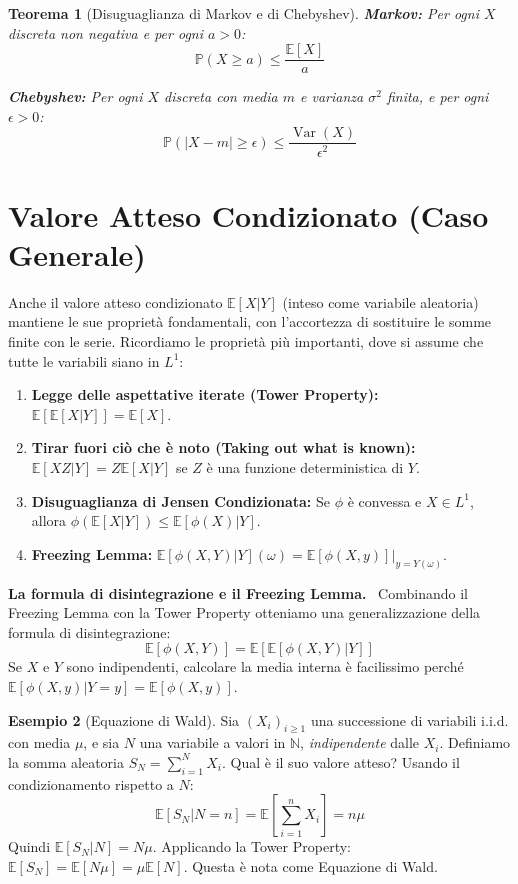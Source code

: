 \documentclass[11pt, a4paper]{report}
\theoremstyle{plain}
\newtheorem{theorem}{Teorema}[chapter]
\theoremstyle{definition}
\newtheorem{esempio}[theorem]{Esempio}
\theoremstyle{remark}
\newenvironment{hint}[1][Hint]
{\begin{mdframed}[backgroundcolor=blue!5, linecolor=blue!50, linewidth=2pt, topline=false, rightline=false, bottomline=false]
\textbf{\textsf{#1.}}\ }
{\end{mdframed}}
\newcommand{\PP}{\mathbb{P}}
\newcommand{\E}{\mathbb{E}}
\newcommand{\N}{\mathbb{N}}
\newcommand{\1}{\mathbf{1}}
\begin{document}
\begin{theorem}[Disuguaglianza di Markov e di Chebyshev]
\textbf{Markov:} Per ogni $X$ discreta non negativa e per ogni $a > 0$:
\[ \PP(X \ge a) \le \frac{\E[X]}{a} \]

\textbf{Chebyshev:} Per ogni $X$ discreta con media $m$ e varianza $\sigma^2$ finita, e per ogni $\epsilon > 0$:
\[ \PP(|X - m| \ge \epsilon) \le \frac{\operatorname{Var}(X)}{\epsilon^2} \]
\end{theorem}

\section{Valore Atteso Condizionato (Caso Generale)}

Anche il valore atteso condizionato $\E[X|Y]$ (inteso come variabile aleatoria) mantiene le sue proprietà fondamentali, con l'accortezza di sostituire le somme finite con le serie.
Ricordiamo le proprietà più importanti, dove si assume che tutte le variabili siano in $L^1$:
\begin{enumerate}
    \item \textbf{Legge delle aspettative iterate (Tower Property):} $\E[\E[X|Y]] = \E[X]$.
    \item \textbf{Tirar fuori ciò che è noto (Taking out what is known):} $\E[X Z | Y] = Z \E[X | Y]$ se $Z$ è una funzione deterministica di $Y$.
    \item \textbf{Disuguaglianza di Jensen Condizionata:} Se $\phi$ è convessa e $X \in L^1$, allora $\phi(\E[X|Y]) \le \E[\phi(X)|Y]$.
    \item \textbf{Freezing Lemma:} $\E[\phi(X,Y)|Y](\omega) = \E[\phi(X, y)]\big|_{y=Y(\omega)}$.
\end{enumerate}

\begin{hint}[La formula di disintegrazione e il Freezing Lemma]
    Combinando il Freezing Lemma con la Tower Property otteniamo una generalizzazione della formula di disintegrazione:
    \[ \E[\phi(X,Y)] = \E[\E[\phi(X,Y)|Y]] \]
    Se $X$ e $Y$ sono indipendenti, calcolare la media interna è facilissimo perché $\E[\phi(X,y)|Y=y] = \E[\phi(X,y)]$.
\end{hint}

\begin{esempio}[Equazione di Wald]
Sia $(X_i)_{i \ge 1}$ una successione di variabili i.i.d. con media $\mu$, e sia $N$ una variabile a valori in $\N$, \emph{indipendente} dalle $X_i$. Definiamo la somma aleatoria $S_N = \sum_{i=1}^N X_i$.
Qual è il suo valore atteso? Usando il condizionamento rispetto a $N$:
\[ \E[S_N|N=n] = \E\left[\sum_{i=1}^n X_i\right] = n\mu \]
Quindi $\E[S_N|N] = N\mu$. Applicando la Tower Property: $\E[S_N] = \E[N\mu] = \mu \E[N]$. Questa è nota come Equazione di Wald.
\end{esempio}
\end{document}
